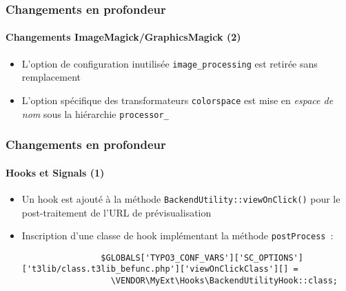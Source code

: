 \begin{frame}[fragile]
	\frametitle{Changements en profondeur}
	\framesubtitle{Changements ImageMagick/GraphicsMagick (2)}

	\lstset{basicstyle=\tiny\ttfamily}

	\begin{itemize}

		\item L'option de configuration inutilisée \texttt{image\_processing} est retirée sans remplacement

		\item L'option spécifique des transformateurs \texttt{colorspace} est mise en \textit{espace de nom}
			sous la hiérarchie \texttt{processor\_}

	\end{itemize}

\end{frame}

\begin{frame}[fragile]
	\frametitle{Changements en profondeur}
	\framesubtitle{Hooks et Signals (1)}

	\lstset{basicstyle=\tiny\ttfamily}

	\begin{itemize}

		\item Un hook est ajouté à la méthode \texttt{BackendUtility::viewOnClick()}
			pour le post-traitement de l'URL de prévisualisation

		\item Inscription d'une classe de hook implémentant la méthode \texttt{postProcess}~:

			\begin{lstlisting}
				$GLOBALS['TYPO3_CONF_VARS']['SC_OPTIONS']['t3lib/class.t3lib_befunc.php']['viewOnClickClass'][] =
				  \VENDOR\MyExt\Hooks\BackendUtilityHook::class;
			\end{lstlisting}

	\end{itemize}

\end{frame}

